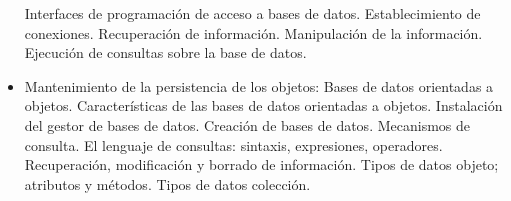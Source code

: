 \begin{itemize}[itemsep=0.1em, topsep=0.1em]
\subitem Interfaces de programación de acceso a bases de datos.
\subitem Establecimiento de conexiones.
\subitem Recuperación de información.
\subitem Manipulación de la información.
\subitem Ejecución de consultas sobre la base de datos.
\item Mantenimiento de la persistencia de los objetos:
\subitem Bases de datos orientadas a objetos.
\subitem Características de las bases de datos orientadas a objetos.
\subitem Instalación del gestor de bases de datos.
\subitem Creación de bases de datos.
\subitem Mecanismos de consulta.
\subitem El lenguaje de consultas: sintaxis, expresiones, operadores.
\subitem Recuperación, modificación y borrado de información.
\subitem Tipos de datos objeto; atributos y métodos.
\subitem Tipos de datos colección.
\end{itemize}
